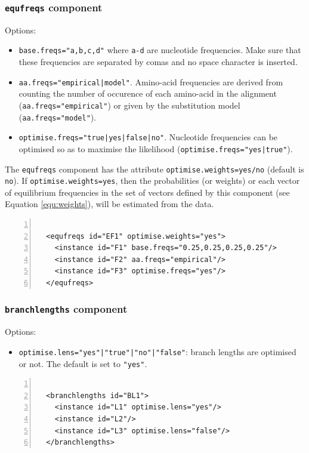 \documentclass[a4paper,12pt]{article}
\newcommand{\x}[1]{\texttt{#1}}
\begin{document}
\subsubsection{{\tt equfreqs} component}
Options:
\begin{itemize}
\item \x{base.freqs="a,b,c,d"} where \x{a-d} are nucleotide frequencies. Make sure that these
  frequencies are separated by comas and no space character is inserted.
\item \x{aa.freqs="empirical|model"}. Amino-acid frequencies are derived from counting the number of
  occurence of each amino-acid in the alignment (\x{aa.freqs="empirical"}) or given by the
  substitution model (\x{aa.freqs="model"}).
\item \x{optimise.freqs="true|yes|false|no"}. Nucleotide frequencies can be optimised so as to maximise
  the likelihood (\x{optimise.freqs="yes|true"}).
\end{itemize}

The {\tt equfreqs} component has the attribute {\tt optimise.weights=yes/no} (default is {\tt
  no}). If {\tt optimise.weights=yes}, then the probabilities (or weights) or each vector of
equilibrium frequencies in the
set of vectors defined by this component (see Equation \ref{equ:weights}), will be estimated from the data.

\vspace{0.2cm}
\begin{Verbatim}[frame=single, label=Example of `equfreqs' component, samepage=true,
  baselinestretch=0.5, fontsize=\small, numbers=left]

  <equfreqs id="EF1" optimise.weights="yes">
    <instance id="F1" base.freqs="0.25,0.25,0.25,0.25"/>
    <instance id="F2" aa.freqs="empirical"/>
    <instance id="F3" optimise.freqs="yes"/>
  </equfreqs>

\end{Verbatim}

\subsubsection{{\tt branchlengths} component}
Options:
\begin{itemize}
\item \x{optimise.lens="yes"|"true"|"no"|"false"}: branch lengths are optimised or not. The default
  is set to \x{"yes"}.
\end{itemize}
\vspace{0.2cm}
\begin{Verbatim}[frame=single, label=Example of `branchlengths' component, baselinestretch=0.5,
  fontsize=\small, numbers=left]

  <branchlengths id="BL1">
    <instance id="L1" optimise.lens="yes"/>
    <instance id="L2"/>
    <instance id="L3" optimise.lens="false"/>
  </branchlengths>

\end{Verbatim}
\end{document}
